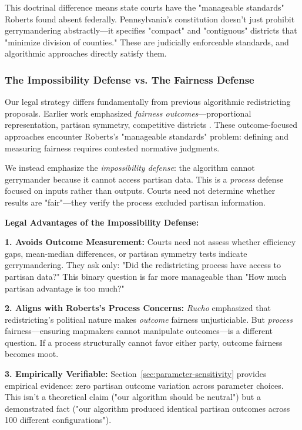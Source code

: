 This doctrinal difference means state courts have the "manageable standards" Roberts found absent federally. Pennsylvania's constitution doesn't just prohibit gerrymandering abstractly—it specifies "compact" and "contiguous" districts that "minimize division of counties." These are judicially enforceable standards, and algorithmic approaches directly satisfy them.

\subsubsection{The Impossibility Defense vs. The Fairness Defense}

Our legal strategy differs fundamentally from previous algorithmic redistricting proposals. Earlier work emphasized \textit{fairness outcomes}—proportional representation, partisan symmetry, competitive districts \citep{stephanopoulos2015partisan,duchin2018gerrymandering}. These outcome-focused approaches encounter Roberts's "manageable standards" problem: defining and measuring fairness requires contested normative judgments.

We instead emphasize the \textit{impossibility defense}: the algorithm cannot gerrymander because it cannot access partisan data. This is a \textit{process} defense focused on inputs rather than outputs. Courts need not determine whether results are "fair"—they verify the process excluded partisan information.

\textbf{Legal Advantages of the Impossibility Defense:}

\textbf{1. Avoids Outcome Measurement:} Courts need not assess whether efficiency gaps, mean-median differences, or partisan symmetry tests indicate gerrymandering. They ask only: "Did the redistricting process have access to partisan data?" This binary question is far more manageable than "How much partisan advantage is too much?"

\textbf{2. Aligns with Roberts's Process Concerns:} \textit{Rucho} emphasized that redistricting's political nature makes \textit{outcome} fairness unjusticiable. But \textit{process} fairness—ensuring mapmakers cannot manipulate outcomes—is a different question. If a process structurally cannot favor either party, outcome fairness becomes moot.

\textbf{3. Empirically Verifiable:} Section~\ref{sec:parameter-sensitivity} provides empirical evidence: zero partisan outcome variation across parameter choices. This isn't a theoretical claim ("our algorithm should be neutral") but a demonstrated fact ("our algorithm produced identical partisan outcomes across 100 different configurations").

